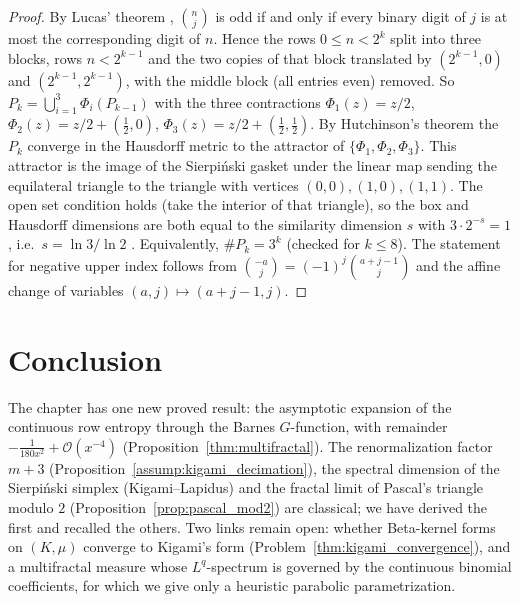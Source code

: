 \documentclass[11pt,a4paper]{article}
\theoremstyle{plain}
\theoremstyle{definition}
\theoremstyle{remark}
\numberwithin{equation}{section}
\begin{document}
\begin{proof}
By Lucas' theorem \cite{lucas1878}, $\binom{n}{j}$ is odd if and only if every binary digit of $j$ is at most the corresponding digit of $n$. Hence the rows $0 \le n < 2^{k}$ split into three blocks, rows $n < 2^{k-1}$ and the two copies of that block translated by $(2^{k-1}, 0)$ and $(2^{k-1}, 2^{k-1})$, with the middle block (all entries even) removed. So $P_k = \bigcup_{i=1}^3 \Phi_i(P_{k-1})$ with the three contractions $\Phi_1(z) = z/2$, $\Phi_2(z) = z/2 + (\frac12, 0)$, $\Phi_3(z) = z/2 + (\frac12, \frac12)$. By Hutchinson's theorem the $P_k$ converge in the Hausdorff metric to the attractor of $\{\Phi_1, \Phi_2, \Phi_3\}$. This attractor is the image of the Sierpi\'nski gasket under the linear map sending the equilateral triangle to the triangle with vertices $(0,0), (1,0), (1,1)$. The open set condition holds (take the interior of that triangle), so the box and Hausdorff dimensions are both equal to the similarity dimension $s$ with $3 \cdot 2^{-s} = 1$, i.e.\ $s = \ln 3/\ln 2$ \cite{falconer2014}. Equivalently, $\#P_k = 3^k$ (checked for $k \le 8$). The statement for negative upper index follows from $\binom{-a}{j} = (-1)^j\binom{a+j-1}{j}$ and the affine change of variables $(a, j) \mapsto (a + j - 1, j)$.
\end{proof}

\section{Conclusion}

The chapter has one new proved result: the asymptotic expansion of the continuous row entropy through the Barnes $G$-function, with remainder $-\frac{1}{180x^2} + \mathcal{O}(x^{-4})$ (Proposition~\ref{thm:multifractal}). The renormalization factor $m+3$ (Proposition~\ref{assump:kigami_decimation}), the spectral dimension of the Sierpi\'nski simplex (Kigami--Lapidus) and the fractal limit of Pascal's triangle modulo $2$ (Proposition~\ref{prop:pascal_mod2}) are classical; we have derived the first and recalled the others. Two links remain open: whether Beta-kernel forms on $(K,\mu)$ converge to Kigami's form (Problem~\ref{thm:kigami_convergence}), and a multifractal measure whose $L^q$-spectrum is governed by the continuous binomial coefficients, for which we give only a heuristic parabolic parametrization.
\end{document}
